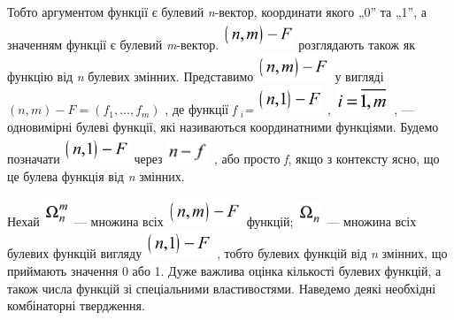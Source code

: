 Тобто аргументом функції є булевий \textit{n}{}-вектор, координати якого „0” та
„1”,  а значенням функції є булевий \textit{m}{}-вектор. 
\includegraphics[width=0.8417in,height=0.3346in]{crypt-img/crypt-img84.png} 
розглядають також як функцію від \textit{n} булевих змінних. Представимо 
\includegraphics[width=0.8618in,height=0.3354in]{crypt-img/crypt-img85.png}  у
вигляді   ${(n,m)-F=(f_{{1}},\dots,f_{{m}})}$ ,  де функції
\textit{f} ${{}_{{i}}}$\textit{=}
\includegraphics[width=0.7709in,height=0.3335in]{crypt-img/crypt-img86.png} , 
\includegraphics[width=0.6457in,height=0.3327in]{crypt-img/crypt-img87.png} , ---
одновимірні  булеві функції, які називаються координатними функціями. Будемо
позначати 
\includegraphics[width=0.7752in,height=0.3354in]{crypt-img/crypt-img88.png} 
через  
\includegraphics[width=0.5102in,height=0.2709in]{crypt-img/crypt-img89.png}  ,
або просто \textit{f}, якщо з контексту ясно, що це булева функція від
\textit{n} змінних. 

Нехай 
\includegraphics[width=0.3118in,height=0.3335in]{crypt-img/crypt-img90.png}  ---
множина всіх 
\includegraphics[width=0.8811in,height=0.3339in]{crypt-img/crypt-img91.png} 
функцій; 
\includegraphics[width=0.2984in,height=0.2984in]{crypt-img/crypt-img92.png}  ---
множина всіх булевих функцій вигляду  
\includegraphics[width=0.7866in,height=0.3346in]{crypt-img/crypt-img93.png} ,
тобто булевих функцій від \textit{n }змінних, що приймають значення 0 або 1.
Дуже важлива оцінка кількості  булевих функцій, а також числа функцій зі
спеціальними властивостями. Наведемо деякі необхідні комбінаторні твердження.

